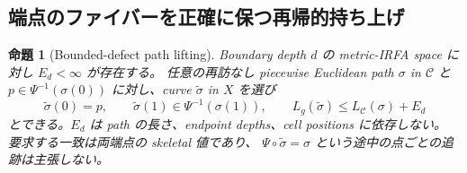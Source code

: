 \documentclass[11pt,a4paper]{ltjsarticle}
\newcommand{\cC}{\mathcal C}
\newcommand{\wt}{\widetilde}
\theoremstyle{plain}
\newtheorem{proposition}[proposition]{命題}
\theoremstyle{definition}
\theoremstyle{remark}
\begin{document}
\subsection{端点のファイバーを正確に保つ再帰的持ち上げ}
\begin{proposition}[Bounded-defect path lifting]
\label{prop:lifting}
Boundary depth $d$ の metric-IRFA space に対し $E_d<\infty$ が存在する。
任意の再訪なし piecewise Euclidean path $\sigma$ in $\cC$ と $p\in\Psi^{-1}(\sigma(0))$ に対し、curve $\wt\sigma$ in $X$ を選び
\[
 \wt\sigma(0)=p,\qquad
 \wt\sigma(1)\in\Psi^{-1}(\sigma(1)),\qquad
 L_g(\wt\sigma)\le L_\cC(\sigma)+E_d
\]
とできる。$E_d$ は path の長さ、endpoint depths、cell positions に依存しない。
要求する一致は両端点の skeletal 値であり、
$\Psi\circ\wt\sigma=\sigma$ という途中の点ごとの追跡は主張しない。
\end{proposition}
\end{document}
